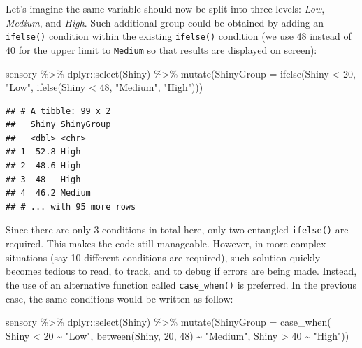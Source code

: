 \documentclass[
]{krantz}
\makeatletter
\newenvironment{Shaded}{\begin{snugshade}}{\end{snugshade}}
\newcommand{\AttributeTok}[1]{\textcolor[rgb]{0.61,0.61,0.61}{#1}}
\newcommand{\DecValTok}[1]{\textcolor[rgb]{0.06,0.06,0.06}{#1}}
\newcommand{\FunctionTok}[1]{\textcolor[rgb]{0,0,0}{#1}}
\newcommand{\NormalTok}[1]{#1}
\newcommand{\SpecialCharTok}[1]{\textcolor[rgb]{0,0,0}{#1}}
\newcommand{\StringTok}[1]{\textcolor[rgb]{0.5,0.5,0.5}{#1}}
\newenvironment{kframe}{%
\medskip{}
\setlength{\fboxsep}{.8em}
 \def\at@end@of@kframe{}%
 \ifinner\ifhmode%
  \def\at@end@of@kframe{\end{minipage}}%
  \begin{minipage}{\columnwidth}%
 \fi\fi%
 \def\FrameCommand##1{\hskip\@totalleftmargin \hskip-\fboxsep
 \colorbox{shadecolor}{##1}\hskip-\fboxsep
     \hskip-\linewidth \hskip-\@totalleftmargin \hskip\columnwidth}%
 \MakeFramed {\advance\hsize-\width
   \@totalleftmargin\z@ \linewidth\hsize
   \@setminipage}}%
 {\par\unskip\endMakeFramed%
 \at@end@of@kframe}
\renewenvironment{Shaded}{\begin{kframe}}{\end{kframe}}
\makeatother
\begin{document}
Let's imagine the same variable should now be split into three levels: \emph{Low}, \emph{Medium}, and \emph{High}. Such additional group could be obtained by adding an \texttt{ifelse()} condition within the existing \texttt{ifelse()} condition (we use 48 instead of 40 for the upper limit to \texttt{Medium} so that results are displayed on screen):

\begin{Shaded}
\begin{Highlighting}[]
\NormalTok{sensory }\SpecialCharTok{\%\textgreater{}\%}
\NormalTok{  dplyr}\SpecialCharTok{::}\FunctionTok{select}\NormalTok{(Shiny) }\SpecialCharTok{\%\textgreater{}\%}
  \FunctionTok{mutate}\NormalTok{(}\AttributeTok{ShinyGroup =} \FunctionTok{ifelse}\NormalTok{(Shiny }\SpecialCharTok{\textless{}} \DecValTok{20}\NormalTok{, }\StringTok{"Low"}\NormalTok{,}
                             \FunctionTok{ifelse}\NormalTok{(Shiny }\SpecialCharTok{\textless{}} \DecValTok{48}\NormalTok{, }\StringTok{"Medium"}\NormalTok{, }\StringTok{"High"}\NormalTok{)))}
\end{Highlighting}
\end{Shaded}

\begin{verbatim}
## # A tibble: 99 x 2
##   Shiny ShinyGroup
##   <dbl> <chr>     
## 1  52.8 High      
## 2  48.6 High      
## 3  48   High      
## 4  46.2 Medium    
## # ... with 95 more rows
\end{verbatim}

Since there are only 3 conditions in total here, only two entangled \texttt{ifelse()} are required. This makes the code still manageable. However, in more complex situations (say 10 different conditions are required), such solution quickly becomes tedious to read, to track, and to debug if errors are being made. Instead, the use of an alternative function called \texttt{case\_when()} is preferred. In the previous case, the same conditions would be written as follow:

\begin{Shaded}
\begin{Highlighting}[]
\NormalTok{sensory }\SpecialCharTok{\%\textgreater{}\%}
\NormalTok{  dplyr}\SpecialCharTok{::}\FunctionTok{select}\NormalTok{(Shiny) }\SpecialCharTok{\%\textgreater{}\%}
  \FunctionTok{mutate}\NormalTok{(}\AttributeTok{ShinyGroup =} \FunctionTok{case\_when}\NormalTok{(}
\NormalTok{    Shiny }\SpecialCharTok{\textless{}} \DecValTok{20} \SpecialCharTok{\textasciitilde{}} \StringTok{"Low"}\NormalTok{,}
    \FunctionTok{between}\NormalTok{(Shiny, }\DecValTok{20}\NormalTok{, }\DecValTok{48}\NormalTok{) }\SpecialCharTok{\textasciitilde{}} \StringTok{"Medium"}\NormalTok{,}
\NormalTok{    Shiny }\SpecialCharTok{\textgreater{}} \DecValTok{40} \SpecialCharTok{\textasciitilde{}} \StringTok{"High"}\NormalTok{))}
\end{Highlighting}
\end{Shaded}
\end{document}

